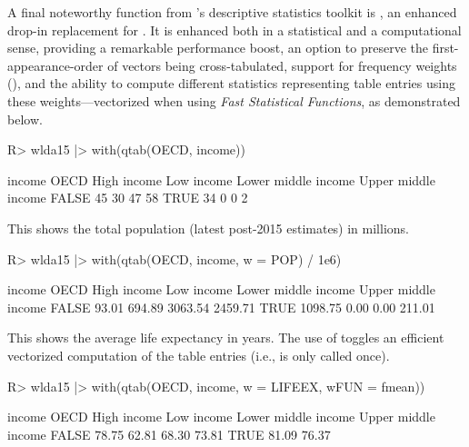 \documentclass[nojss]{jss} %
\newcommand{\fct}[1]{\code{#1()}}
\begin{document}
A final noteworthy function from 's descriptive statistics toolkit is \fct{qtab}, an enhanced drop-in replacement for \fct{table}. It is enhanced both in a statistical and a computational sense, providing a remarkable performance boost, an option  to preserve the first-appearance-order of vectors being cross-tabulated, support for frequency weights (), and the ability to compute different statistics representing table entries using these weights---vectorized when using \emph{Fast Statistical Functions}, as demonstrated below.
%
\begin{Schunk}
\begin{Sinput}
R> wlda15 |> with(qtab(OECD, income))
\end{Sinput}
\begin{Soutput}
       income
OECD    High income Low income Lower middle income Upper middle income
  FALSE          45         30                  47                  58
  TRUE           34          0                   0                   2
\end{Soutput}
\end{Schunk}
This shows the total population (latest post-2015 estimates) in millions.
\begin{Schunk}
\begin{Sinput}
R> wlda15 |> with(qtab(OECD, income, w = POP) / 1e6)
\end{Sinput}
\begin{Soutput}
       income
OECD    High income Low income Lower middle income Upper middle income
  FALSE       93.01     694.89             3063.54             2459.71
  TRUE      1098.75       0.00                0.00              211.01
\end{Soutput}
\end{Schunk}
This shows the average life expectancy in years. The use of \fct{fmean} toggles an efficient vectorized computation of the table entries (i.e., \fct{fmean} is only called once).
\begin{Schunk}
\begin{Sinput}
R> wlda15 |> with(qtab(OECD, income, w = LIFEEX, wFUN = fmean))
\end{Sinput}
\begin{Soutput}
       income
OECD    High income Low income Lower middle income Upper middle income
  FALSE       78.75      62.81               68.30               73.81
  TRUE        81.09                                              76.37
\end{Soutput}
\end{Schunk}
\end{document}
